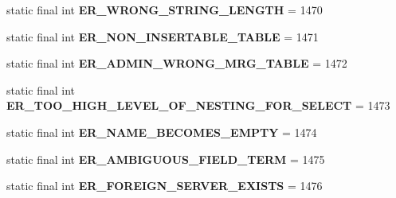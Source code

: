 \begin{DoxyCompactItemize}
\item 
\mbox{\label{classcom_1_1mysql_1_1cj_1_1exceptions_1_1_mysql_error_numbers_ada8413105d0370c305d0a8c10c985819}} 
static final int {\bfseries E\+R\+\_\+\+W\+R\+O\+N\+G\+\_\+\+S\+T\+R\+I\+N\+G\+\_\+\+L\+E\+N\+G\+TH} = 1470
\item 
\mbox{\label{classcom_1_1mysql_1_1cj_1_1exceptions_1_1_mysql_error_numbers_a9ee3c2a87f129f48d36aa51c405d4c71}} 
static final int {\bfseries E\+R\+\_\+\+N\+O\+N\+\_\+\+I\+N\+S\+E\+R\+T\+A\+B\+L\+E\+\_\+\+T\+A\+B\+LE} = 1471
\item 
\mbox{\label{classcom_1_1mysql_1_1cj_1_1exceptions_1_1_mysql_error_numbers_a620bed2daa63a2d3443aec70a72831b9}} 
static final int {\bfseries E\+R\+\_\+\+A\+D\+M\+I\+N\+\_\+\+W\+R\+O\+N\+G\+\_\+\+M\+R\+G\+\_\+\+T\+A\+B\+LE} = 1472
\item 
\mbox{\label{classcom_1_1mysql_1_1cj_1_1exceptions_1_1_mysql_error_numbers_ad65d5008e3de96f5bda185c11f54bc91}} 
static final int {\bfseries E\+R\+\_\+\+T\+O\+O\+\_\+\+H\+I\+G\+H\+\_\+\+L\+E\+V\+E\+L\+\_\+\+O\+F\+\_\+\+N\+E\+S\+T\+I\+N\+G\+\_\+\+F\+O\+R\+\_\+\+S\+E\+L\+E\+CT} = 1473
\item 
\mbox{\label{classcom_1_1mysql_1_1cj_1_1exceptions_1_1_mysql_error_numbers_a61db27382e1c58399b37d8fbc28bb6e4}} 
static final int {\bfseries E\+R\+\_\+\+N\+A\+M\+E\+\_\+\+B\+E\+C\+O\+M\+E\+S\+\_\+\+E\+M\+P\+TY} = 1474
\item 
\mbox{\label{classcom_1_1mysql_1_1cj_1_1exceptions_1_1_mysql_error_numbers_a52efd1811f6c2332bcb0faeb725bbbb7}} 
static final int {\bfseries E\+R\+\_\+\+A\+M\+B\+I\+G\+U\+O\+U\+S\+\_\+\+F\+I\+E\+L\+D\+\_\+\+T\+E\+RM} = 1475
\item 
\mbox{\label{classcom_1_1mysql_1_1cj_1_1exceptions_1_1_mysql_error_numbers_ad5fdb5d6b8d615f5d04cc0e7e6d9f0cb}} 
static final int {\bfseries E\+R\+\_\+\+F\+O\+R\+E\+I\+G\+N\+\_\+\+S\+E\+R\+V\+E\+R\+\_\+\+E\+X\+I\+S\+TS} = 1476

\end{DoxyCompactItemize}
